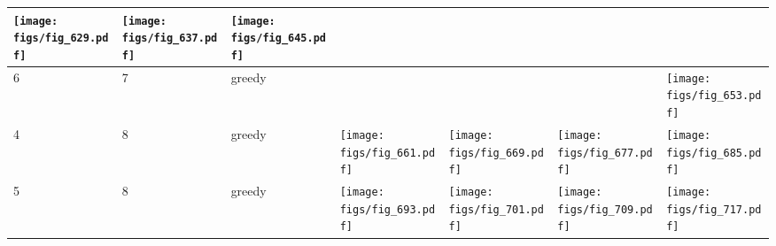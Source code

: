 \documentclass[oneside,canadian,landscape]{article}
\begin{document}
\begin{center}
\begin{longtable}{|l|l|l||l|l|l|l|}
\begin{minipage}{3.5cm}
\texttt{[image: figs/fig\_629.pdf]}
\end{minipage}
&\begin{minipage}{3.5cm}
\texttt{[image: figs/fig\_637.pdf]}
\end{minipage}
&\begin{minipage}{3.5cm}
\texttt{[image: figs/fig\_645.pdf]}
\end{minipage}
\\ \hline
6&7&greedy&&&&\begin{minipage}{3.5cm}
\texttt{[image: figs/fig\_653.pdf]}
\end{minipage}
\\ \hline
4&8&greedy&\begin{minipage}{3.5cm}
\texttt{[image: figs/fig\_661.pdf]}
\end{minipage}
&\begin{minipage}{3.5cm}
\texttt{[image: figs/fig\_669.pdf]}
\end{minipage}
&\begin{minipage}{3.5cm}
\texttt{[image: figs/fig\_677.pdf]}
\end{minipage}
&\begin{minipage}{3.5cm}
\texttt{[image: figs/fig\_685.pdf]}
\end{minipage}
\\ \hline
5&8&greedy&\begin{minipage}{3.5cm}
\texttt{[image: figs/fig\_693.pdf]}
\end{minipage}
&\begin{minipage}{3.5cm}
\texttt{[image: figs/fig\_701.pdf]}
\end{minipage}
&\begin{minipage}{3.5cm}
\texttt{[image: figs/fig\_709.pdf]}
\end{minipage}
&\begin{minipage}{3.5cm}
\texttt{[image: figs/fig\_717.pdf]}
\end{minipage}
\\ \hline
\end{longtable}
\end{center}
\end{document}
